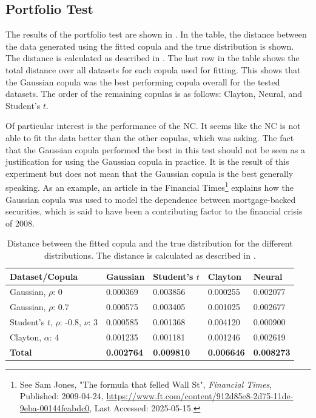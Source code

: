 \subsection{Portfolio Test}
The results of the portfolio test are shown in . In the table, the distance between the data generated using the fitted copula and the true distribution is shown. The distance is calculated as described in . The last row in the table shows the total distance over all datasets for each copula used for fitting. This shows that the Gaussian copula was the best performing copula overall for the tested datasets. The order of the remaining copulas is as follows: Clayton, Neural, and Student's $t$. 

Of particular interest is the performance of the \gls{NC}. It seems like the \gls{NC} is not able to fit the data better than the other copulas, which \RQthree{} was asking. The fact that the Gaussian copula performed the best in this test should not be seen as a justification for using the Gaussian copula in practice. It is the result of this experiment but does not mean that the Gaussian copula is the best generally speaking. As an example, an article in the Financial Times\footnote{See Sam Jones, "The formula that felled Wall St", \textit{Financial Times}, Published: 2009-04-24, \url{https://www.ft.com/content/912d85e8-2d75-11de-9eba-00144feabdc0}, Last Accessed: 2025-05-15.} explains how the Gaussian copula was used to model the dependence between mortgage-backed securities, which is said to have been a contributing factor to the financial crisis of 2008.

\begin{table}[h!]
    \centering
    \caption{Distance between the fitted copula and the true distribution for the different distributions. The distance is calculated as described in .}
    \begin{tabular}{lllll}
    \textbf{Dataset/Copula} & \textbf{Gaussian} & \textbf{Student's $t$} & \textbf{Clayton} & \textbf{Neural} \\
    \hline
    Gaussian, $\rho$: 0               & 0.000369 & 0.003856 & 0.000255 & 0.002077 \\
    Gaussian, $\rho$: 0.7             & 0.000575 & 0.003405 & 0.001025 & 0.002677 \\
    Student's $t$, $\rho$: -0.8, $\nu$: 3 & 0.000585 & 0.001368 & 0.004120 & 0.000900 \\ 
    Clayton, $\alpha$: 4              & 0.001235 & 0.001181 & 0.001246 & 0.002619 \\
    \textbf{Total}      & \textbf{0.002764} & \textbf{0.009810} & \textbf{0.006646} & \textbf{0.008273} \\
    \end{tabular}
    \label{tab:DistributionDistances}
\end{table}

